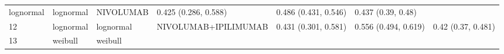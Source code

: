 \documentclass[
]{article}
\begin{document}
\begin{longtable}[]{@{}lllllll@{}}
\begin{minipage}[t]{0.09\columnwidth}
lognormal\strut
\end{minipage} & \begin{minipage}[t]{0.09\columnwidth}\raggedright
lognormal\strut
\end{minipage} & \begin{minipage}[t]{0.15\columnwidth}\raggedright
NIVOLUMAB\strut
\end{minipage} & \begin{minipage}[t]{0.15\columnwidth}\raggedright
0.425 (0.286, 0.588)\strut
\end{minipage} & \begin{minipage}[t]{0.15\columnwidth}\raggedright
0.486 (0.431, 0.546)\strut
\end{minipage} & \begin{minipage}[t]{0.15\columnwidth}\raggedright
0.437 (0.39, 0.48)\strut
\end{minipage}\tabularnewline
\begin{minipage}[t]{0.03\columnwidth}\raggedright
12\strut
\end{minipage} & \begin{minipage}[t]{0.09\columnwidth}\raggedright
lognormal\strut
\end{minipage} & \begin{minipage}[t]{0.09\columnwidth}\raggedright
lognormal\strut
\end{minipage} & \begin{minipage}[t]{0.15\columnwidth}\raggedright
NIVOLUMAB+IPILIMUMAB\strut
\end{minipage} & \begin{minipage}[t]{0.15\columnwidth}\raggedright
0.431 (0.301, 0.581)\strut
\end{minipage} & \begin{minipage}[t]{0.15\columnwidth}\raggedright
0.556 (0.494, 0.619)\strut
\end{minipage} & \begin{minipage}[t]{0.15\columnwidth}\raggedright
0.42 (0.37, 0.481)\strut
\end{minipage}\tabularnewline
\begin{minipage}[t]{0.03\columnwidth}\raggedright
13\strut
\end{minipage} & \begin{minipage}[t]{0.09\columnwidth}\raggedright
weibull\strut
\end{minipage} & \begin{minipage}[t]{0.09\columnwidth}\raggedright
weibull\strut
\end{minipage} & \begin{minipage}[t]{0.15\columnwidth}\raggedright

\end{minipage}
\end{longtable}
\end{document}
